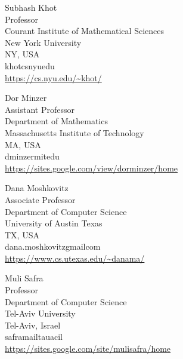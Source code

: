 \documentclass{toc}
\begin{document}
%
%
%

%
%
%
%
%
\begin{tocauthors}
\begin{tocinfo}[khot]
 Subhash Khot\\
 Professor\\
 Courant Institute of Mathematical Sciences\\
 New York University\\
 NY, USA\\
 khot\tocat{}cs\tocdot{}nyu\tocdot{}edu \\   %
 \url{https://cs.nyu.edu/~khot/}      %
\end{tocinfo}
\begin{tocinfo}[minzer]
  Dor Minzer\\
  Assistant Professor\\
  Department of Mathematics\\
  Massachusetts Institute of Technology\\
  MA, USA\\
  dminzer\tocat{}mit\tocdot{}edu \\
  \url{https://sites.google.com/view/dorminzer/home}
\end{tocinfo}
\begin{tocinfo}[moshkovitz]
  Dana Moshkovitz\\
  Associate Professor\\
  Department of Computer Science\\
  University of Austin Texas\\
  TX, USA\\
  dana.moshkovitz\tocat{}gmail\tocdot{}com\\
  \url{https://www.cs.utexas.edu/~danama/}
\end{tocinfo}
\begin{tocinfo}[safra]
  Muli Safra\\
  Professor\\
  Department of Computer Science\\
  Tel-Aviv University\\
  Tel-Aviv, Israel\\
  safra\tocat{}mail\tocdot{}tau\tocdot{}ac\tocdot{}il\\
  \url{https://sites.google.com/site/mulisafra/home}
\end{tocinfo}
\end{tocauthors}
\end{document}
